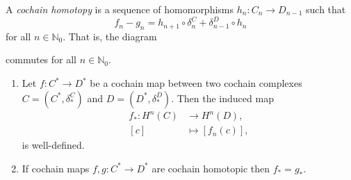 \begin{definition}
    A \emph{cochain homotopy} is a sequence of homomorphisms $h_n: C_n \to D_{n-1}$ such that
    \[
        f_n - g_n = h_{n+1} \circ \delta_n^C + \delta_{n-1}^D \circ h_n
    \]
    for all $n \in \mathbb N_0$. That is, the diagram
    \begin{center}
    \end{center}
    commutes for all $n \in \mathbb N_0$.
\end{definition}

\begin{lemma}
    \hspace{0em}
    \begin{enumerate}
        \item Let $f: C^* \to D^*$ be a cochain map between two cochain complexes $C = (C^*, \delta^C_*)$ and $D = (D^*, \delta^D_*)$. Then the induced map
              \begin{align*}
                  f_*: H^n(C) & \to H^n(D),       \\
                  [c]         & \mapsto [f_n(c)],
              \end{align*}
              is well-defined.
        \item If cochain maps $f, g: C^* \to D^*$ are cochain homotopic then $f_* = g_*$.
    \end{enumerate}
\end{lemma}

